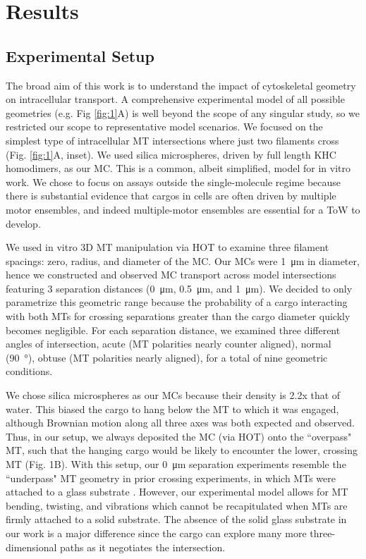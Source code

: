 \section{Results}

\subsection{Experimental Setup}

The broad aim of this work is to understand the impact of cytoskeletal geometry on intracellular transport. A comprehensive experimental model of all possible geometries (e.g. Fig \ref{fig:1}A) is well beyond the scope of any singular study, so we restricted our scope to representative model scenarios. We focused on the simplest type of intracellular MT intersections where just two filaments cross (Fig. \ref{fig:1}A, inset). We used silica microspheres, driven by full length KHC homodimers, as our MC. This is a common, albeit simplified, model for in vitro work. We chose to focus on assays outside the single-molecule regime because there is substantial evidence that
cargos in cells are often driven by multiple motor ensembles, and indeed multiple-motor ensembles are essential for a ToW to develop.

We used in vitro 3D MT manipulation via HOT \cite{Bergman2015} to examine three filament spacings: zero, radius, and diameter of the MC. Our MCs were \SI{1}{\micro\meter} in diameter, hence we constructed and observed MC transport across model intersections featuring 3 separation distances (\SI{0}{\micro\meter}, \SI{.5}{\micro\meter}, and \SI{1}{\micro\meter}). We decided to only parametrize this geometric range because the probability of a cargo interacting with both MTs for crossing separations greater than the cargo diameter quickly becomes negligible. For each separation distance, we examined three different angles of intersection, acute (MT polarities nearly counter aligned), normal (\SI{90}{\degree}), obtuse (MT polarities nearly aligned), for a total of nine geometric conditions.

We chose silica microspheres as our MCs because their density is 2.2x that of water. This biased the cargo to hang below the MT to which it was engaged, although Brownian motion along all three axes was both expected and observed. Thus, in our setup, we always deposited the MC (via HOT) onto the ``overpass" MT, such that the hanging cargo would be likely to encounter the lower, crossing MT (Fig. 1B). With this setup, our \SI{0}{\micro\meter} separation experiments resemble the ``underpass" MT geometry in prior crossing experiments, in which MTs were attached to a glass substrate \cite{Ross2008,Vershinin2007}. However, our experimental model allows for MT bending, twisting, and vibrations which cannot be recapitulated when MTs are firmly attached to a solid substrate. The absence of the solid glass substrate in our work is a major difference since the cargo can explore many more three-dimensional paths as it negotiates the intersection.

